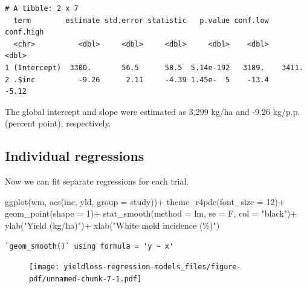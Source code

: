 \documentclass[
  letterpaper,
]{book}
\newenvironment{Shaded}{\begin{snugshade}}{\end{snugshade}}
\newcommand{\AttributeTok}[1]{\textcolor[rgb]{0.40,0.45,0.13}{#1}}
\newcommand{\DecValTok}[1]{\textcolor[rgb]{0.68,0.00,0.00}{#1}}
\newcommand{\FunctionTok}[1]{\textcolor[rgb]{0.28,0.35,0.67}{#1}}
\newcommand{\NormalTok}[1]{\textcolor[rgb]{0.00,0.23,0.31}{#1}}
\newcommand{\SpecialCharTok}[1]{\textcolor[rgb]{0.37,0.37,0.37}{#1}}
\newcommand{\StringTok}[1]{\textcolor[rgb]{0.13,0.47,0.30}{#1}}
\begin{document}
\begin{verbatim}
# A tibble: 2 x 7
  term        estimate std.error statistic   p.value conf.low conf.high
  <chr>          <dbl>     <dbl>     <dbl>     <dbl>    <dbl>     <dbl>
1 (Intercept)  3300.       56.5      58.5  5.14e-192   3189.    3411.  
2 .$inc          -9.26      2.11     -4.39 1.45e-  5    -13.4     -5.12
\end{verbatim}

The global intercept and slope were estimated as 3,299 kg/ha and -9.26
kg/p.p. (percent point), respectively.

\hypertarget{individual-regressions}{%
\subsection{Individual regressions}\label{individual-regressions}}

Now we can fit separate regressions for each trial.

\begin{Shaded}
\begin{Highlighting}[]
\FunctionTok{ggplot}\NormalTok{(wm, }\FunctionTok{aes}\NormalTok{(inc, yld, }\AttributeTok{group =}\NormalTok{ study))}\SpecialCharTok{+}
      \FunctionTok{theme\_r4pde}\NormalTok{(}\AttributeTok{font\_size =} \DecValTok{12}\NormalTok{)}\SpecialCharTok{+}
       \FunctionTok{geom\_point}\NormalTok{(}\AttributeTok{shape =} \DecValTok{1}\NormalTok{)}\SpecialCharTok{+}
       \FunctionTok{stat\_smooth}\NormalTok{(}\AttributeTok{method =}\NormalTok{ lm, }\AttributeTok{se =}\NormalTok{ F, }\AttributeTok{col =} \StringTok{"black"}\NormalTok{)}\SpecialCharTok{+}
       \FunctionTok{ylab}\NormalTok{(}\StringTok{"Yield (kg/ha)"}\NormalTok{)}\SpecialCharTok{+}
       \FunctionTok{xlab}\NormalTok{(}\StringTok{"White mold incidence (\%)"}\NormalTok{)}
\end{Highlighting}
\end{Shaded}

\begin{verbatim}
`geom_smooth()` using formula = 'y ~ x'
\end{verbatim}

\begin{figure}[H]

{\centering \texttt{[image: yieldloss-regression-models\_files/figure-pdf/unnamed-chunk-7-1.pdf]}

}

\end{figure}
\end{document}

